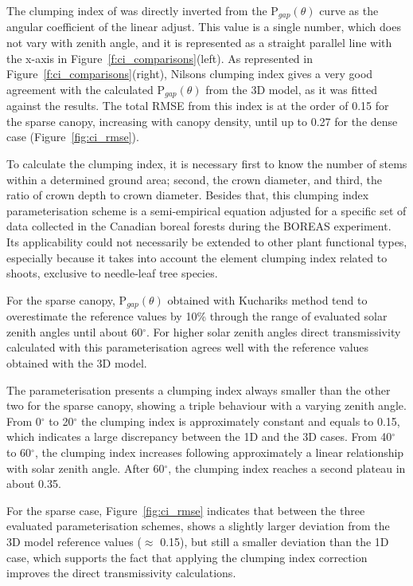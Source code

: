 \documentclass[a4paper,11pt]{report}
\begin{document}
The clumping index of \citet{Nilson1971} was directly inverted from the P$_{gap}(\theta)$ curve as the angular coefficient of the linear adjust. This value is a single number, which does not vary with zenith angle, and it is represented as a straight parallel line with the x-axis in Figure~\ref{f:ci_comparisons}(left). As represented in Figure~\ref{f:ci_comparisons}(right), Nilson\textquotesingle s clumping index gives a very good agreement with the calculated P$_{gap}(\theta)$ from the 3D model, as it was fitted against the results. The total RMSE from this index is at the order of 0.15 for the sparse canopy, increasing with canopy density, until up to 0.27 for the dense case (Figure~\ref{fig:ci_rmse}).

To calculate the \citet{Kucharik1999} clumping index, it is necessary first to know the number of stems within a determined ground area; second, the crown diameter, and third, the ratio of crown depth to crown diameter. Besides that, this clumping index parameterisation scheme is a semi-empirical equation adjusted for a specific set of data collected in the Canadian boreal forests during the BOREAS experiment. Its applicability could not necessarily be extended to other plant functional types, especially because it takes into account the element clumping index related to shoots, exclusive to needle-leaf tree species.

For the sparse canopy, P$_{gap}(\theta)$ obtained with Kucharik\textquotesingle s method tend to overestimate the reference values by 10\% through the range of evaluated solar zenith angles until about 60$^{\circ}$. For higher solar zenith angles direct transmissivity calculated with this parameterisation agrees well with the reference values obtained with the 3D model.

The \citet{Kucharik1999} parameterisation presents a clumping index always smaller than the other two for the sparse canopy, showing a triple behaviour with a varying zenith angle. From 0$^{\circ}$ to 20$^{\circ}$ the clumping index is approximately constant and equals to 0.15, which indicates a large discrepancy between the 1D and the 3D cases. From 40$^{\circ}$ to 60$^{\circ}$, the clumping index increases following approximately a linear relationship with solar zenith angle. After 60$^{\circ}$, the clumping index reaches a second plateau in about 0.35.

For the sparse case, Figure~\ref{fig:ci_rmse} indicates that between the three evaluated parameterisation schemes, \citet{Kucharik1999} shows a slightly larger deviation from the 3D model reference values ($\approx$ 0.15), but still a smaller deviation than the 1D case, which supports the fact that applying the clumping index correction improves the direct transmissivity calculations.
\end{document}
